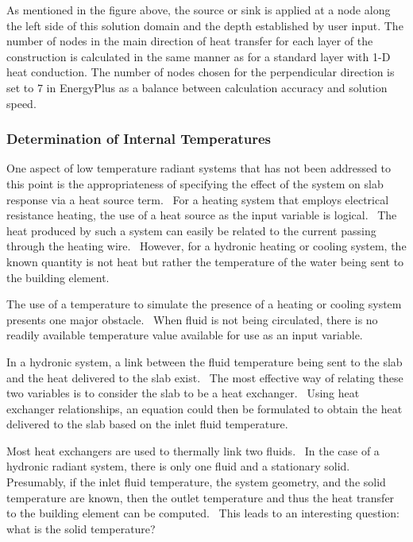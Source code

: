As mentioned in the figure above, the source or sink is applied at a node along the left side of this solution domain and the depth established by user input.  The number of nodes in the main direction of heat transfer for each layer of the construction is calculated in the same manner as for a standard layer with 1-D heat conduction.  The number of nodes chosen for the perpendicular direction is set to 7 in EnergyPlus as a balance between calculation accuracy and solution speed.

\subsubsection{Determination of Internal Temperatures}\label{determination-of-internal-temperatures}

One aspect of low temperature radiant systems that has not been addressed to this point is the appropriateness of specifying the effect of the system on slab response via a heat source term.~ For a heating system that employs electrical resistance heating, the use of a heat source as the input variable is logical.~ The heat produced by such a system can easily be related to the current passing through the heating wire.~ However, for a hydronic heating or cooling system, the known quantity is not heat but rather the temperature of the water being sent to the building element.

The use of a temperature to simulate the presence of a heating or cooling system presents one major obstacle.~ When fluid is not being circulated, there is no readily available temperature value available for use as an input variable.

In a hydronic system, a link between the fluid temperature being sent to the slab and the heat delivered to the slab exist.~ The most effective way of relating these two variables is to consider the slab to be a heat exchanger.~ Using heat exchanger relationships, an equation could then be formulated to obtain the heat delivered to the slab based on the inlet fluid temperature.

Most heat exchangers are used to thermally link two fluids.~ In the case of a hydronic radiant system, there is only one fluid and a stationary solid.~ Presumably, if the inlet fluid temperature, the system geometry, and the solid temperature are known, then the outlet temperature and thus the heat transfer to the building element can be computed.~ This leads to an interesting question:~ what is the solid temperature?


